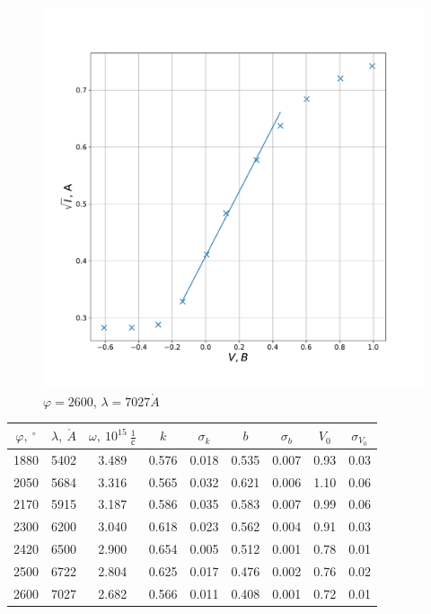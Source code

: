\documentclass[a4paper, 12pt]{article}
\renewcommand{\phi}{\varphi}
\renewcommand{\AA}{\ensuremath{\mathring{A}}}
\begin{document}
\begin{figure}[!h]
    \centering
    \includegraphics[scale=0.35]{2600}
    \caption {$\phi = 2600$, $\lambda = 7027 \AA$}
\end{figure}

\begin{table}[!h]
    \centering
    \begin{tabular}{|c|c|c|c|c|c|c|c|c|}
        \hline
        $\phi, ~^\circ$ & $\lambda, ~\AA$ & $\omega, ~10^{15}~\frac{1}{с}$ & $k$ & $\sigma_k$ & $b$ & $\sigma_b$ & $V_0$ & $\sigma_{V_0}$ \\ \hline
        1880 & 5402 & 3.489 & 0.576 & 0.018 & 0.535 & 0.007 & 0.93 & 0.03\\ \hline
        2050 & 5684 & 3.316 & 0.565 & 0.032 & 0.621 & 0.006 & 1.10 & 0.06\\ \hline
        2170 & 5915 & 3.187 & 0.586 & 0.035 & 0.583 & 0.007 & 0.99 & 0.06\\ \hline
        2300 & 6200 & 3.040 & 0.618 & 0.023 & 0.562 & 0.004 & 0.91 & 0.03\\ \hline
        2420 & 6500 & 2.900 & 0.654 & 0.005 & 0.512 & 0.001 & 0.78 & 0.01\\ \hline
        2500 & 6722 & 2.804 & 0.625 & 0.017 & 0.476 & 0.002 & 0.76 & 0.02\\ \hline
        2600 & 7027 & 2.682 & 0.566 & 0.011 & 0.408 & 0.001 & 0.72 & 0.01
        \\ \hline
    \end{tabular}
\end{table}
\end{document}
